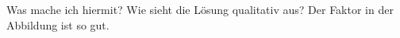 
\begin{note}
Was mache ich hiermit? Wie sieht die Lösung qualitativ aus? Der Faktor in der
Abbildung ist so gut.
\end{note}